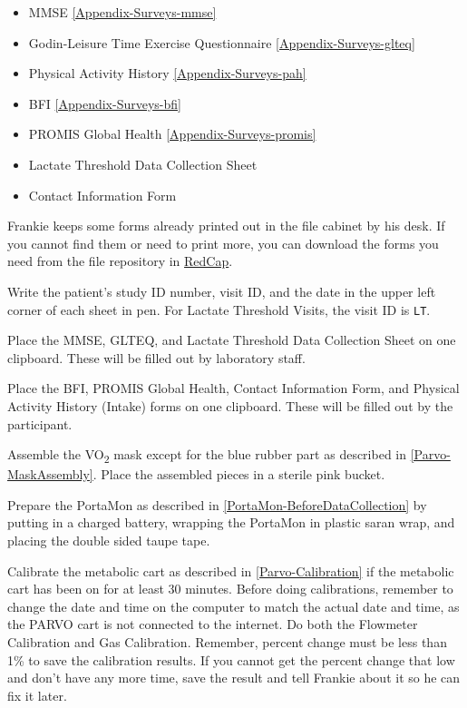 \documentclass[
]{book}
\providecommand{\tightlist}{%
  \setlength{\itemsep}{0pt}\setlength{\parskip}{0pt}}
\begin{document}
\begin{itemize}
\tightlist
\item
  MMSE \ref{Appendix-Surveys-mmse}
\item
  Godin-Leisure Time Exercise Questionnaire \ref{Appendix-Surveys-glteq}
\item
  Physical Activity History \ref{Appendix-Surveys-pah}
\item
  BFI \ref{Appendix-Surveys-bfi}
\item
  PROMIS Global Health \ref{Appendix-Surveys-promis}
\item
  Lactate Threshold Data Collection Sheet
\item
  Contact Information Form
\end{itemize}

Frankie keeps some forms already printed out in the file cabinet by his desk. If you cannot find them or need to print more, you can download the forms you need from the file repository in \href{https://redcap.prismahealth.org}{RedCap}.

Write the patient's study ID number, visit ID, and the date in the upper left corner of each sheet in pen. For Lactate Threshold Visits, the visit ID is \texttt{LT}.

Place the MMSE, GLTEQ, and Lactate Threshold Data Collection Sheet on one clipboard. These will be filled out by laboratory staff.

Place the BFI, PROMIS Global Health, Contact Information Form, and Physical Activity History (Intake) forms on one clipboard. These will be filled out by the participant.

Assemble the VO\textsubscript{2} mask except for the blue rubber part as described in \ref{Parvo-MaskAssembly}. Place the assembled pieces in a sterile pink bucket.

Prepare the PortaMon as described in \ref{PortaMon-BeforeDataCollection} by putting in a charged battery, wrapping the PortaMon in plastic saran wrap, and placing the double sided taupe tape.

Calibrate the metabolic cart as described in \ref{Parvo-Calibration} if the metabolic cart has been on for at least 30 minutes. Before doing calibrations, remember to change the date and time on the computer to match the actual date and time, as the PARVO cart is not connected to the internet. Do both the Flowmeter Calibration and Gas Calibration. Remember, percent change must be less than 1\% to save the calibration results. If you cannot get the percent change that low and don't have any more time, save the result and tell Frankie about it so he can fix it later.
\end{document}
